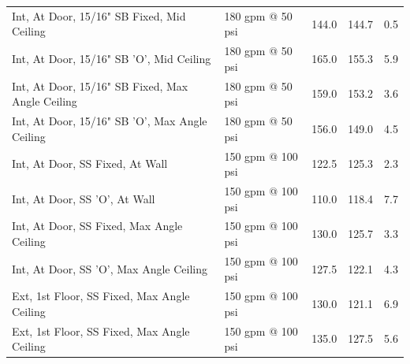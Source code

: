 \documentclass{article}
\begin{document}
\begin{table}[]
\begin{tabular}{lllll}
Int, At Door, 15/16" SB Fixed, Mid Ceiling            & 180 gpm @ 50 psi                    & 144.0                                  & 144.7                                   & 0.5                                     \\
Int, At Door, 15/16" SB 'O', Mid Ceiling              & 180 gpm @ 50 psi                    & 165.0                                  & 155.3                                   & 5.9                                     \\
Int, At Door, 15/16" SB Fixed, Max Angle Ceiling      & 180 gpm @ 50 psi                    & 159.0                                  & 153.2                                   & 3.6                                     \\
Int, At Door, 15/16" SB 'O', Max Angle Ceiling        & 180 gpm @ 50 psi                    & 156.0                                  & 149.0                                   & 4.5                                     \\
Int, At Door, SS Fixed, At Wall                       & 150 gpm @ 100 psi                   & 122.5                                  & 125.3                                   & 2.3                                     \\
Int, At Door, SS 'O', At Wall                         & 150 gpm @ 100 psi                   & 110.0                                  & 118.4                                   & 7.7                                     \\
Int, At Door, SS Fixed, Max Angle Ceiling             & 150 gpm @ 100 psi                   & 130.0                                  & 125.7                                   & 3.3                                     \\
Int, At Door, SS 'O', Max Angle Ceiling               & 150 gpm @ 100 psi                   & 127.5                                  & 122.1                                   & 4.3                                     \\
Ext, 1st Floor, SS Fixed, Max Angle Ceiling           & 150 gpm @ 100 psi                   & 130.0                                  & 121.1                                   & 6.9                                     \\
Ext, 1st Floor, SS Fixed, Max Angle Ceiling           & 150 gpm @ 100 psi                   & 135.0                                  & 127.5                                   & 5.6                                     \\

\end{tabular}
\end{table}
\end{document}
